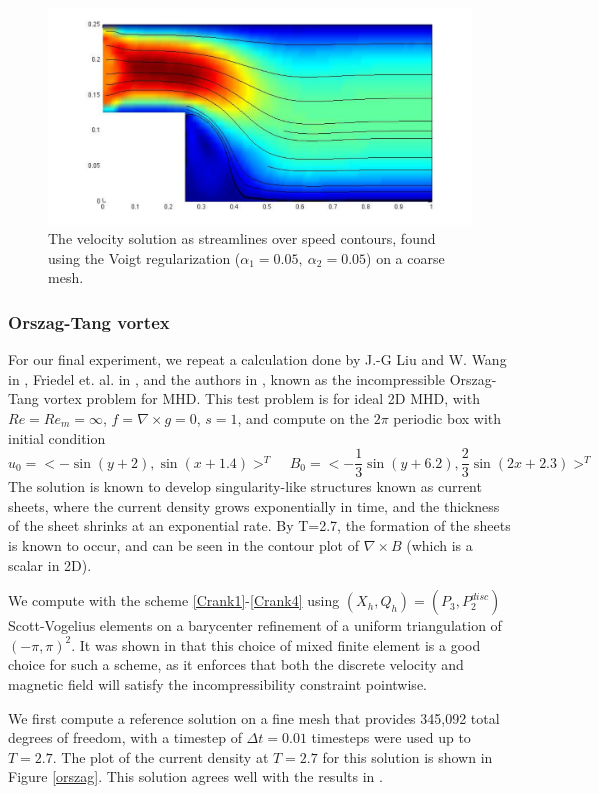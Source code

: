 \documentclass[11pt]{article}%
\numberwithin{equation}{section}
\begin{document}
\begin{figure}[htb]
\begin{center}
\includegraphics[width=.9\textwidth,height=0.25\textwidth, viewport=110 50 750 370, clip]{MHDChannel_VoigtCoarse.pdf}
\caption{\label{mhdchannel_voigtcoarse} The velocity solution as streamlines over speed contours, found using the Voigt regularization  ($\alpha_1=0.05, \ \alpha_2=0.05$) on a coarse mesh.}
\end{center}
\end{figure}




\subsubsection{Orszag-Tang vortex}

For our final experiment, we repeat a calculation done by J.-G Liu and W. Wang in \cite{LW04}, Friedel et. al. in \cite{FGM97}, and the authors in \cite{CLRW10}, known as the incompressible Orszag-Tang vortex problem for MHD.  This test problem
is for ideal 2D MHD, with $Re=Re_m=\infty$, ${f}=\nabla \times {g}= { 0}$, $s=1$, and compute on the $2\pi$ periodic box with initial condition
\[
u_0 = <-\sin(y+2),\sin(x+1.4)>^T \ \ \ \ \ B_0=<-\frac13 \sin(y+6.2),\frac23 \sin(2x+2.3) >^T
\]
The solution is known to develop singularity-like structures known as current sheets, where
the current density grows exponentially in time, and the thickness of the sheet shrinks at an exponential rate.  By T=2.7, the formation of the sheets is known to occur, and can be seen in the contour plot of $ \nabla \times B $ (which is a scalar in 2D).

We compute with the scheme \eqref{Crank1}-\eqref{Crank4} using $(X_h,Q_h)=(P_3,P_2^{disc})$ Scott-Vogelius elements on a barycenter refinement of a uniform triangulation of $(-\pi,\pi)^2$.  It was shown in \cite{CLRW10} that this choice of mixed finite element is a good choice for such a scheme, as it enforces that both the discrete velocity and magnetic field will satisfy the incompressibility constraint pointwise.

We first compute a reference solution on a fine mesh that provides 345,092 total degrees of freedom, with a timestep of 
 $\Delta t=0.01$ timesteps were used up to $T=2.7$.  The plot of the current density at $T=2.7$ for this solution is shown in Figure \ref{orszag}.  This solution agrees well with the results in \cite{LW04,FGM97,CLRW10}.
\end{document}
